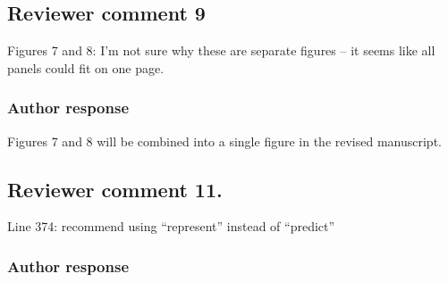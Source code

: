 \documentclass[11pt]{scrartcl}
\providecommand{\DIFadd}[1]{{\protect\textcolor{blue}{\uwave{#1}}}} %
\providecommand{\DIFdel}[1]{{\protect\textcolor{red}{\sout{#1}}}}                      %
\providecommand{\DIFaddFL}[1]{\DIFadd{#1}} %
\providecommand{\DIFdelFL}[1]{\DIFdel{#1}} %
\providecommand{\DIFaddbeginFL}{} %
\providecommand{\DIFaddendFL}{} %
\providecommand{\DIFdelbeginFL}{} %
\providecommand{\DIFdelendFL}{} %
\begin{document}
\subsection*{Reviewer comment 9}

Figures 7 and 8:  I’m not sure why these are separate figures – it seems like all panels could fit on one page.

\subsubsection*{Author response}

Figures 7 and 8 will be combined into a single figure in the revised
manuscript.

%

\subsection*{Reviewer comment 11.}
 Line 374: recommend using “represent” instead of “predict”

\subsubsection*{Author response}
\end{document}
